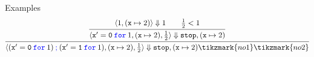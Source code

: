 \documentclass{beamer}
\newcommand{\blue}[1]{\textcolor{blue}{#1}}
\begin{document}
\begin{frame}{Examples}
        \scriptsize
        \[
                \infer{
                        \langle (\mathtt{x' = 0} \> \mathtt{\blue{for}} \> 1) \>
                        \blue{\mathtt{;}} \> (\mathtt{x' = 1} \> \mathtt{\blue{for}} \> 1),
                        (\mathtt{x} \mapsto 2), \frac{1}{2} \rangle \Downarrow
                        \mathtt{stop}, (\mathtt{x} \mapsto 2) \tikzmark{no1} \tikzmark{no2}
                }{
                        \infer{ 
                                \langle \mathtt{x' = 0} \> \mathtt{\blue{for}} \> 1,
                                (\mathtt{x} \mapsto 2), \frac{1}{2} \rangle \Downarrow
                                \mathtt{stop}, (\mathtt{x} \mapsto 2) 
                        }{
                                \langle 1, (\mathtt{x} \mapsto 2) \rangle \Downarrow 1
                                \qquad
                                \frac{1}{2} < 1
                        }
                }
        \]         
        

\end{frame}
\end{document}
